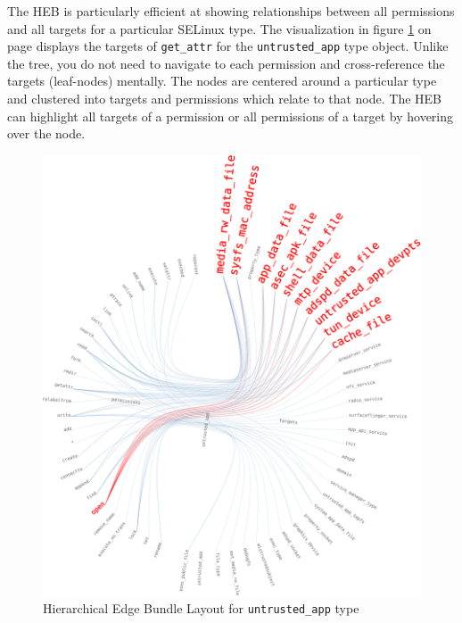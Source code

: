 \documentclass[conference]{IEEEtran}
\begin{document}
The HEB is particularly efficient at showing relationships between all permissions and all targets for a particular SELinux type. The visualization in figure \ref{fig:heb} on page \pageref{fig:heb} displays the targets of \texttt{get\_attr} for the \texttt{untrusted\_app} type object. Unlike the tree, you do not need to navigate to each permission and cross-reference the targets (leaf-nodes) mentally. The nodes are centered around a particular type and clustered into targets and permissions which relate to that node. The HEB can highlight all targets of a permission or all permissions of a target by hovering over the node. 

\begin{figure}
\includegraphics[max width={\columnwidth}, frame]{g4.png}
\caption{Hierarchical Edge Bundle Layout for \texttt{untrusted\_app} type}
\label{fig:heb}
\end{figure}


\end{document}
